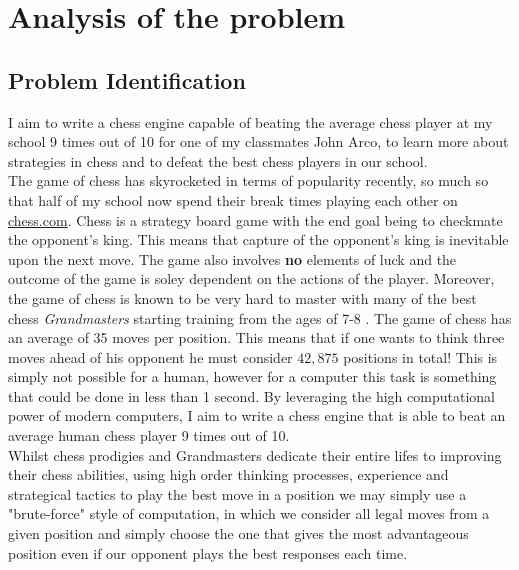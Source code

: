 \pagestyle{fancy}

\chapter{Analysis of the problem}

\section{Problem Identification}
I aim to write a chess engine capable of beating the 
average chess player at my school 9 times out of 10 for 
one of my classmates John Arco, to learn more about 
strategies in chess and to defeat the best chess players 
in our school.\\

The game of chess has skyrocketed in terms of popularity
recently, so much so that half of my school now spend their
break times playing each other on \url{chess.com}. Chess 
is a strategy board game with the end goal being to checkmate
the opponent's king. \cite{rules} This means that capture of 
the opponent's king is inevitable upon the next move. The 
game also involves \textbf{no} elements of luck and the 
outcome of the game is soley dependent on the actions of the
player. Moreover, the game of chess is known to be very
hard to master with many of the best chess
\textit{Grandmasters} starting training from the
ages of 7-8 \cite{Magnus}. The game of chess has an average
of 35 moves \cite{branch} per position. This means that 
if one wants to think three moves ahead of his opponent
he must consider $42,875$ positions in total! This is
simply not possible for a human, however for a computer
this task is something that could be done in less than
1 second. By leveraging the high computational power
of modern computers, I aim to write a chess engine that
is able to beat an average human chess player 9 times
out of 10.\\

Whilst chess prodigies and Grandmasters dedicate their entire
lifes to improving their chess abilities, using high order 
thinking processes, experience and strategical tactics to play
the best move in a position we may simply use a "brute-force" 
style of computation, in which we consider all legal moves from a 
given position and simply choose the one that gives the most
advantageous position even if our opponent plays the best 
responses each time.\\

